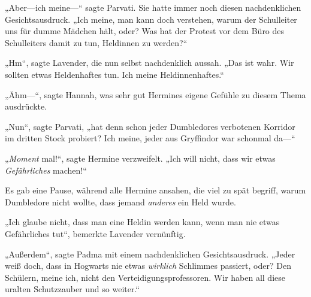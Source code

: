 „Aber—ich meine—“ sagte Parvati. Sie hatte immer noch diesen nachdenklichen Gesichtsausdruck.
„Ich meine, man kann doch verstehen, warum der Schulleiter uns für dumme Mädchen hält, oder? Was hat der Protest vor dem Büro des Schulleiters damit zu tun, Heldinnen zu werden?“

„Hm“, sagte Lavender, die nun selbst nachdenklich aussah.
„Das ist wahr. Wir sollten etwas Heldenhaftes tun. Ich meine Heldinnenhaftes.“

„Ähm—“, sagte Hannah, was sehr gut Hermines eigene Gefühle zu diesem Thema ausdrückte.

„Nun“, sagte Parvati, „hat denn schon jeder Dumbledores verbotenen Korridor im dritten Stock probiert? Ich meine, jeder aus Gryffindor war schonmal da—“

„\emph{Moment} mal!“, sagte Hermine verzweifelt.
„Ich will nicht, dass wir etwas \emph{Gefährliches} machen!“

Es gab eine Pause, während alle Hermine ansahen, die viel zu spät begriff, warum Dumbledore nicht wollte, dass jemand \emph{anderes} ein Held wurde.

„Ich glaube nicht, dass man eine Heldin werden kann, wenn man nie etwas Gefährliches tut“, bemerkte Lavender vernünftig.

„Außerdem“, sagte Padma mit einem nachdenklichen Gesichtsausdruck.
„Jeder weiß doch, dass in Hogwarts nie etwas \emph{wirklich} Schlimmes passiert, oder? Den Schülern, meine ich, nicht den Verteidigungsprofessoren. Wir haben all diese uralten Schutzzauber und so weiter.“

